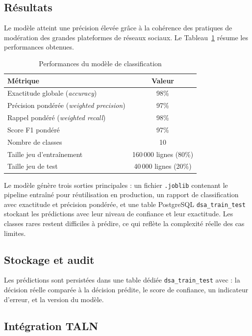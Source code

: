 \documentclass[10pt,twocolumn,a4paper]{article}
\begin{document}
\subsection{Résultats}

Le modèle atteint une précision élevée grâce à la cohérence des pratiques de modération des grandes plateformes de réseaux sociaux. Le Tableau~\ref{tab:ml_results} résume les performances obtenues.

\begin{table}[H]
\centering
\caption{Performances du modèle de classification}
\label{tab:ml_results}
\footnotesize
\begin{tabular}{|l|c|}
\hline
\textbf{Métrique} & \textbf{Valeur} \\
\hline
Exactitude globale (\textit{accuracy}) & 98\% \\
\hline
Précision pondérée (\textit{weighted precision}) & 97\% \\
\hline
Rappel pondéré (\textit{weighted recall}) & 98\% \\
\hline
Score F1 pondéré & 97\% \\
\hline
Nombre de classes & 10 \\
\hline
Taille jeu d'entraînement & 160\,000 lignes (80\%) \\
\hline
Taille jeu de test & 40\,000 lignes (20\%) \\
\hline
\end{tabular}
\end{table}

Le modèle génère trois sorties principales : un fichier \texttt{.joblib} contenant le pipeline entraîné pour réutilisation en production, un rapport de classification avec exactitude et précision pondérée, et une table PostgreSQL \texttt{dsa\_train\_test} stockant les prédictions avec leur niveau de confiance et leur exactitude. Les classes rares restent difficiles à prédire, ce qui reflète la complexité réelle des cas limites.

\subsection{Stockage et audit}

Les prédictions sont persistées dans une table dédiée \texttt{dsa\_train\_test} avec : la décision réelle comparée à la décision prédite, le score de confiance, un indicateur d'erreur, et la version du modèle.

\subsection{Intégration TALN}
\end{document}
